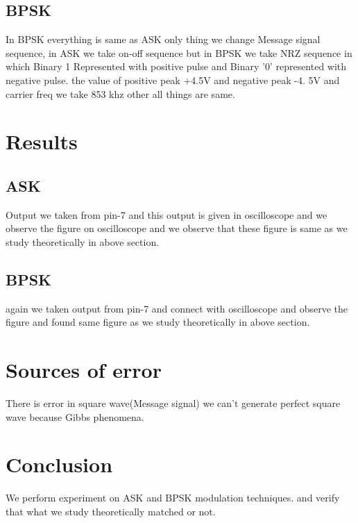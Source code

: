 \documentclass{article}
\begin{document}
\subsection{BPSK}
In BPSK everything is same as ASK only thing we change Message signal sequence, in ASK we take on-off sequence but in BPSK we take NRZ sequence in which Binary 1 Represented with positive pulse and Binary '0' represented with negative pulse. the value of positive peak +4.5V and negative peak -4. 5V and carrier freq we take 853 khz other all things are same. 

\section{Results}
 \subsection{ASK}
 Output we taken from pin-7 and this output is given in oscilloscope and we observe the figure on oscilloscope and we observe that these figure is same as we study theoretically in above section. 
 \subsection{BPSK}
 again we taken output from pin-7 and connect with oscilloscope and observe the figure and found same figure as we study theoretically in above section. 

\section{Sources of error}
 There is error in square wave(Message signal) we can't generate perfect square wave because Gibbs phenomena. 


\section{Conclusion}
 We perform experiment on ASK and BPSK modulation techniques. and verify that what we study theoretically matched or not. 
\end{document}
